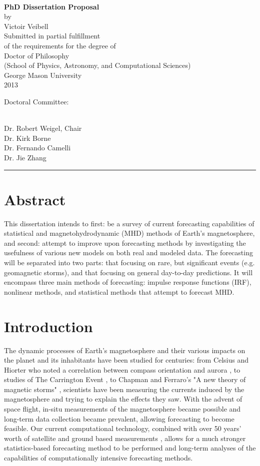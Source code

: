 \documentclass[10pt]{article}
\def\titlepage#1#2#3#4#5#6{
 \begin{singlespace}
 \hbox{ }
 \begin{center}

  {\Large\bf #1 \mbox{}} \\

  \vfill
  by \\
  \vspace{2ex} %
  #2 \\
  \vfill
   Submitted in partial fulfillment \\
   of the requirements for the degree of \\
   #3 \\
   (#4) \\
   George Mason University \\
   #5 \\
 \end{center}
 \vfill
  Doctoral Committee: \\[2ex]
  \mbox{ }\hspace{0.6in}
  \parbox{5.3in}{#6}
 \end{singlespace}
}
\begin{document}
\titlepage{PhD Dissertation Proposal}{Victoir Veibell}{Doctor of Philosophy}{School of Physics, Astronomy, and Computational Sciences}{2013}
{Dr. Robert Weigel, Chair\\ 
Dr. Kirk Borne\\
Dr. Fernando Camelli\\
Dr. Jie Zhang\\
}

\hrule
\setlength{\parskip}{3ex}
\renewcommand{\labelitemi}{$-$}

\newpage
\section{Abstract}

This dissertation intends to first: be a survey of current forecasting capabilities of statistical and  magnetohydrodynamic (MHD) methods of Earth's magnetosphere, and second: attempt to improve upon forecasting methods by investigating the usefulness of various new models on both real and modeled data. The forecasting will be separated into two parts: that focusing on rare, but significant events (e.g. geomagnetic storms), and that focusing on general day-to-day predictions. It will encompass three main methods of forecasting: impulse response functions (IRF), nonlinear methods, and statistical methods that attempt to forecast MHD.

\section{Introduction}

The dynamic processes of Earth's magnetosphere and their various impacts on the planet and its inhabitants have been studied for centuries: from Celsius and Hiorter who noted a correlation between compass orientation and aurora \citep{Maunder} , to studies of The Carrington Event \citep{Carrington}, to Chapman and Ferraro's "A new theory of magnetic storms" \citep{Chapman}, scientists have been measuring the currents induced by the magnetosphere and trying to explain the effects they saw. With the advent of space flight, in-situ measurements of the magnetosphere became possible and long-term data collection became prevalent, allowing forecasting to become feasible. Our current computational technology, combined with over 50 years' worth of satellite and ground based measurements \citep{HistMagnetometer}, allows for a much stronger statistics-based forecasting method to be performed and long-term analyses of the capabilities of computationally intensive forecasting methods.
\end{document}
